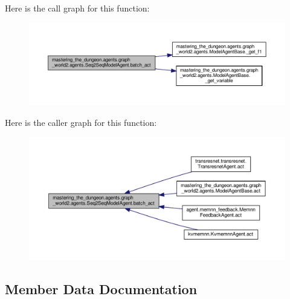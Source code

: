 Here is the call graph for this function\+:
\nopagebreak
\begin{figure}[H]
\begin{center}
\leavevmode
\includegraphics[width=350pt]{classmastering__the__dungeon_1_1agents_1_1graph__world2_1_1agents_1_1Seq2SeqModelAgent_a22165996af8efddaf0305c4bfb89ee0f_cgraph}
\end{center}
\end{figure}
Here is the caller graph for this function\+:
\nopagebreak
\begin{figure}[H]
\begin{center}
\leavevmode
\includegraphics[width=350pt]{classmastering__the__dungeon_1_1agents_1_1graph__world2_1_1agents_1_1Seq2SeqModelAgent_a22165996af8efddaf0305c4bfb89ee0f_icgraph}
\end{center}
\end{figure}


\subsection{Member Data Documentation}
\mbox{\label{classmastering__the__dungeon_1_1agents_1_1graph__world2_1_1agents_1_1Seq2SeqModelAgent_ac3cd37ced8d808f9e6f2c84e6460da20}} 
